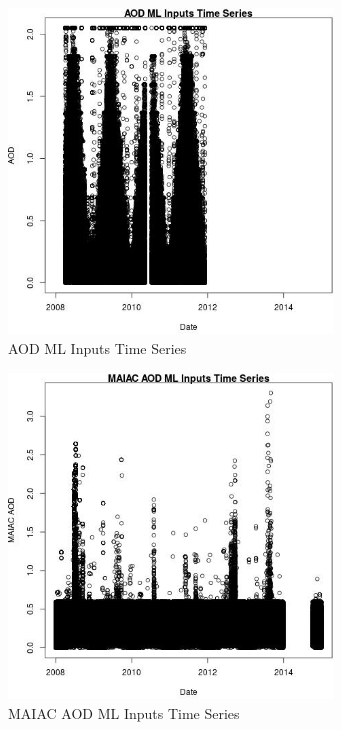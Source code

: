 \begin{figure} 
\centering  
\includegraphics[width=0.77\textwidth]{Code_Outputs/ML_input_report_ML_input_PM25_Step5_part_d_de_duplicated_aves_ML_input_AODvDate.jpg} 
\caption{\label{fig:ML_input_report_ML_input_PM25_Step5_part_d_de_duplicated_aves_ML_inputAODvDate}AOD ML Inputs Time Series} 
\end{figure} 
 

\begin{figure} 
\centering  
\includegraphics[width=0.77\textwidth]{Code_Outputs/ML_input_report_ML_input_PM25_Step5_part_d_de_duplicated_aves_ML_input_MAIAC_AODvDate.jpg} 
\caption{\label{fig:ML_input_report_ML_input_PM25_Step5_part_d_de_duplicated_aves_ML_inputMAIAC_AODvDate}MAIAC AOD ML Inputs Time Series} 
\end{figure} 
 


